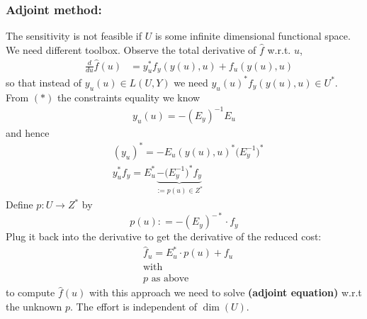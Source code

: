 \documentclass[a4paper,11pt,fleqn]{book}
\theoremstyle{definition}
\theoremstyle{remark}
\begin{document}
\subsubsection{Adjoint method:} 
The sensitivity is not feasible if $U$ is some infinite dimensional functional space. We need different toolbox. 
	Observe the total derivative of $\hat{f}$ w.r.t. $u$, 
	\begin{align*}
		 \quad \frac{d}{du} \hat{f}(u) &= y_u^* f_y(y(u), u) + f_u(y(u), u)
	\end{align*}
	so that instead of $y_u(u) \in L(U, Y)$ we  need $y_u(u)^* f_y(y(u), u) \in U^*$. \\
	From $(*)$ the constraints equality we know
	\begin{align*}
		y_u(u) = -(E_y)^{-1} E_u
	\end{align*}
	and hence
	\begin{align*}
		&(y_u)^* = -E_u(y(u), u)^* \bigg(E_y^{-1}\bigg)^*\\
		&y_u^* f_y = E_u^* \underbrace{ -\bigg(E_y^{-1}\bigg)^*f_y }_{:= p(u) \in Z^*}
	\end{align*}
	Define $p: U \rightarrow  Z^*$ by
	\begin{equation}
		p(u): = -(E_y)^{-*} \cdot f_y
	\end{equation}
	Plug it back into the derivative to get the derivative of the reduced cost:
	\begin{equation}
	\begin{aligned}
		&\hat{f}_u = E_u^* \cdot  p(u) + f_u \\
		& \text{with}\\
		& p \text{ as above}
	\end{aligned}
	\end{equation}
	to compute $\hat{f}(u)$ with this approach we need to solve \textbf{(adjoint equation)} w.r.t the unknown $p$. The effort is independent of $\dim(U)$.
\end{document}
